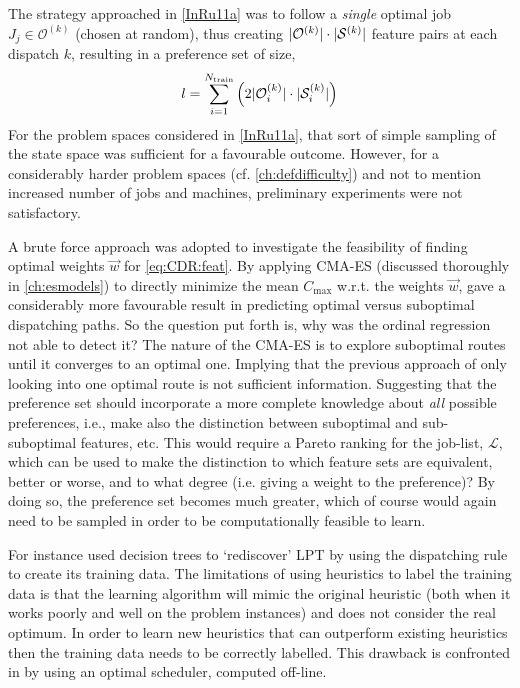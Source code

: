 The strategy approached in  \cref{InRu11a} was to follow a \emph{single} 
optimal job $J_j\in\mathcal{O}^{(k)}$ (chosen at random), thus creating 
$\lvert\mathcal{O}^{(k)}\rvert\cdot\lvert\mathcal{S}^{(k)}\rvert$ feature pairs at each 
dispatch $k$, resulting in a preference set of size,
\begin{equation}\label{eq:sizePsi_b}
l =  \sum_{i=1}^{N_{\train}} \left(2 \abs{\mathcal{O}^{(k)}_i}\cdot 
\abs{\mathcal{S}^{(k)}_i} \right)
\end{equation}
For the problem spaces considered in \cref{InRu11a}, that sort of simple 
sampling of the state space was sufficient for a favourable outcome. 
However, for a considerably harder problem spaces (cf. \cref{ch:defdifficulty}) 
and not to mention increased number of jobs and machines, preliminary 
experiments were not satisfactory. 

A brute force approach was adopted to investigate the feasibility of finding 
optimal weights $\vec{w}$ for \cref{eq:CDR:feat}. 
By applying CMA-ES (discussed thoroughly in \cref{ch:esmodels}) to directly 
minimize the mean $C_{\max}$  w.r.t. the weights $\vec{w}$, gave a considerably 
more favourable result in predicting optimal versus suboptimal dispatching 
paths. 
So the question put forth is, why was the ordinal regression not able to detect 
it?
The nature of the CMA-ES is to explore suboptimal routes until it converges to 
an optimal one. 
Implying that the previous approach of only looking into one optimal route is 
not sufficient information. 
Suggesting that the preference set should incorporate a more complete knowledge 
about \emph{all} possible preferences, i.e., make also the distinction between 
suboptimal and sub-suboptimal features, etc.  
This would require a Pareto ranking for the job-list, $\mathcal{L}$, which can 
be used to make the distinction to which feature sets are equivalent, better or 
worse, and to what degree (i.e. giving a weight to the preference)? 
By doing so, the preference set becomes much greater, which of course would 
again need to be sampled in order to be computationally feasible to learn. 

For instance \cite{Siggi05} used decision trees to `rediscover' LPT by using 
the dispatching rule to create its training data. The limitations of using 
heuristics to label the training data is that the learning algorithm will mimic 
the original heuristic (both when it works poorly and well on the problem 
instances) and does not consider the real optimum. In order to learn new 
heuristics that can outperform existing heuristics then the training data needs 
to be correctly labelled. This drawback is confronted in 
\citep{Malik08,Russell09,Siggi10} by using an optimal scheduler, computed 
off-line. 

